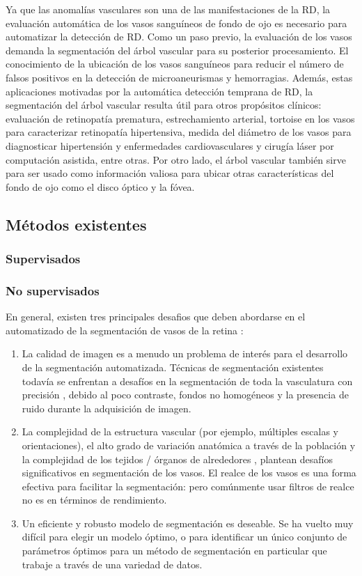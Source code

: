 Ya que las anomalías vasculares son una de las manifestaciones de la RD, la evaluación automática de los vasos sanguíneos de fondo de ojo es necesario para automatizar la detección de RD. Como un paso previo, la evaluación de los vasos demanda la segmentación del árbol vascular para su posterior procesamiento. El conocimiento de la ubicación de los vasos sanguíneos para reducir el número de falsos positivos en la detección de microaneurismas y hemorragias. Además, estas aplicaciones motivadas por la automática detección temprana de RD, la segmentación del árbol vascular resulta útil para otros propósitos clínicos: evaluación de retinopatía prematura, estrechamiento arterial, tortoise en los vasos para caracterizar retinopatía hipertensiva, medida del diámetro de los vasos para diagnosticar hipertensión y enfermedades cardiovasculares y cirugía láser por computación asistida, entre otras.
Por otro lado, el árbol vascular también sirve para ser usado como información valiosa para ubicar otras características del fondo de ojo como el disco óptico y la fóvea. \cite{marin2011new}

	\subsection{M\'etodos existentes}


	\subsubsection{Supervisados}



	\subsubsection{No supervisados}


En general, existen tres principales desafios que deben abordarse en el automatizado de la segmentación de vasos de la retina :
\begin{enumerate}
\item La calidad de imagen es a menudo un problema de interés para el desarrollo de la segmentación automatizada. Técnicas de segmentación existentes todavía se enfrentan a desafíos en la segmentación de toda la vasculatura con precisión , debido al poco contraste, fondos no homogéneos y la presencia de ruido durante la adquisición de imagen.
\item La complejidad de la estructura vascular (por ejemplo, múltiples escalas y orientaciones), el alto grado de variación anatómica a través de la población y la complejidad de los tejidos / órganos de alrededores
, plantean desafíos significativos en segmentación de los vasos. El realce de los vasos es
una forma efectiva para facilitar la segmentación:  pero comúnmente usar filtros de realce no es en términos de rendimiento.
\item Un eficiente y robusto modelo de segmentación  es deseable. Se ha vuelto muy difícil
para elegir un modelo óptimo, o para identificar un único conjunto de parámetros óptimos para un método de segmentación en particular que trabaje a través de una variedad de datos.\cite{zhao2015retinal}
\end{enumerate}